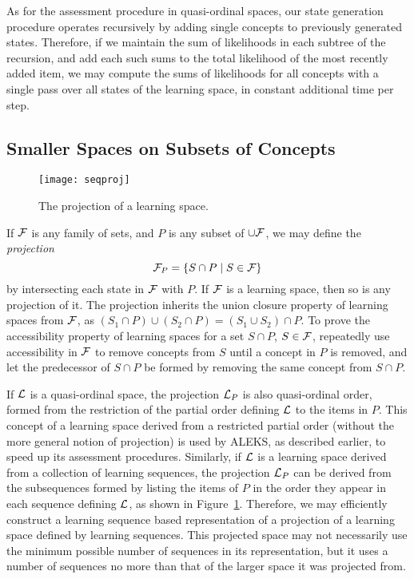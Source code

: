 \documentclass[11pt]{llncs}
\begin{document}
{As for the assessment procedure in quasi-ordinal spaces, our state generation procedure operates recursively by adding single concepts to previously generated states. Therefore, if we maintain the sum of likelihoods in each subtree of the recursion, and add each such sums to the total likelihood of the most recently added item, we may compute the sums of likelihoods for all concepts with a single pass over all states of the learning space, in constant additional time per step.

\subsection{Smaller Spaces on Subsets of Concepts}

\begin{figure}[t]
\centering\texttt{[image: seqproj]}
\caption{The projection of a learning space.}
\label{fig:seqproj}
\end{figure}

If $\cal F$ is any family of sets, and $P$ is any subset of $\cup\cal F$, we may define
the \emph{projection}
$${\cal F}_P=\{S\cap P\mid S\in{\cal F}\}$$
by intersecting each state in ${\cal F}$ with $P$.
If $\cal F$ is a learning space, then so is any projection of it. The projection inherits the union closure property of learning spaces from $\cal F$,
as $(S_1\cap P)\cup(S_2\cap P)=(S_1\cup S_2)\cap P$. To prove the accessibility property of learning spaces
for a set $S\cap P$, $S\in\cal F$, repeatedly use accessibility in $\cal F$ to remove concepts from $S$ until a concept in $P$ is removed, and let the predecessor of $S\cap P$ be formed by removing the same concept from $S\cap P$.

If $\cal L$ is a quasi-ordinal space, the projection ${\cal L}_P$ is also quasi-ordinal order, formed from the restriction of the partial order defining $\cal L$ to the items in $P$. This concept of a learning space derived from a restricted partial order (without the more general notion of projection) is used by ALEKS, as described earlier, to speed up its assessment procedures. Similarly, if $\cal L$ is a learning space derived from a collection of learning sequences, the projection  ${\cal L}_P$ can be derived from the subsequences formed by listing the items of $P$ in the order they appear in each sequence defining $\cal L$, as shown in Figure~\ref{fig:seqproj}. Therefore, we may efficiently construct a learning sequence based representation of a projection of a learning space defined by learning sequences. This projected space may not necessarily use the minimum possible number of sequences in its representation, but it uses a number of sequences no more than that of the larger space it was projected from.

}
\end{document}
